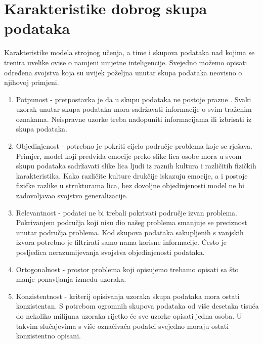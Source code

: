 \documentclass[times, utf8, zavrsni, numeric]{fer}
\begin{document}


\section{Karakteristike dobrog skupa podataka}

Karakteristike modela strojnog učenja, a time i skupova podataka nad kojima se trenira uvelike ovise o namjeni umjetne inteligencije. Svejedno možemo opisati određena svojstva koja su uvijek poželjna unutar skupa podataka neovisno o njihovoj primjeni.

\begin{enumerate}
    \item Potpunost - pretpostavka je da u skupu podataka ne postoje prazne \grqq{}. Svaki uzorak unutar skupa podataka mora sadržavati informacije o svim traženim oznakama. Neispravne uzorke treba nadopuniti informacijama ili izbrisati iz skupa podataka. \citep{baliga1997learning}
    \item Objedinjenost - potrebno je pokriti cijelo područje problema koje se rješava. Primjer, model koji predviđa emocije preko slike lica osobe mora u svom skupu podataka sadržavati slike lica ljudi iz raznih kultura i različitih fizičkih karakteristika. Kako različite kulture drukčije iskazuju emocije, a i postoje fizičke razlike u strukturama lica, bez dovoljne objedinjenosti model ne bi zadovoljavao svojstvo generalizacije. \citep{johnson2019survey} \citep{ali2013classification}
    \item Relevantnost - podatci ne bi trebali pokrivati područje izvan problema. Pokrivanjem područja koji nisu dio našeg problema smanjuje se preciznost unutar područja problema. Kod skupova podataka sakupljenih s vanjskih izvora potrebno je filtrirati samo nama korisne informacije. Često je posljedica nerazumijevanja svojstva objedinjenosti podataka.
    \item Ortogonalnost - prostor problema koji opisujemo trebamo opisati sa što manje ponavljanja između uzoraka. \citep{alelyani2011effect} \citep{johnson2019survey} \citep{ali2013classification}
    \item Konzistentnost - kriterij opisivanja uzoraka skupa podataka mora ostati konzistentan. S potrebom ogromnih skupova podataka od više desetaka tisuća do nekoliko milijuna uzoraka rijetko će sve uzorke opisati jedna osoba. U takvim slučajevima s više označivača podatci svejedno moraju ostati konzistentno opisani.

\end{enumerate}
\end{document}
